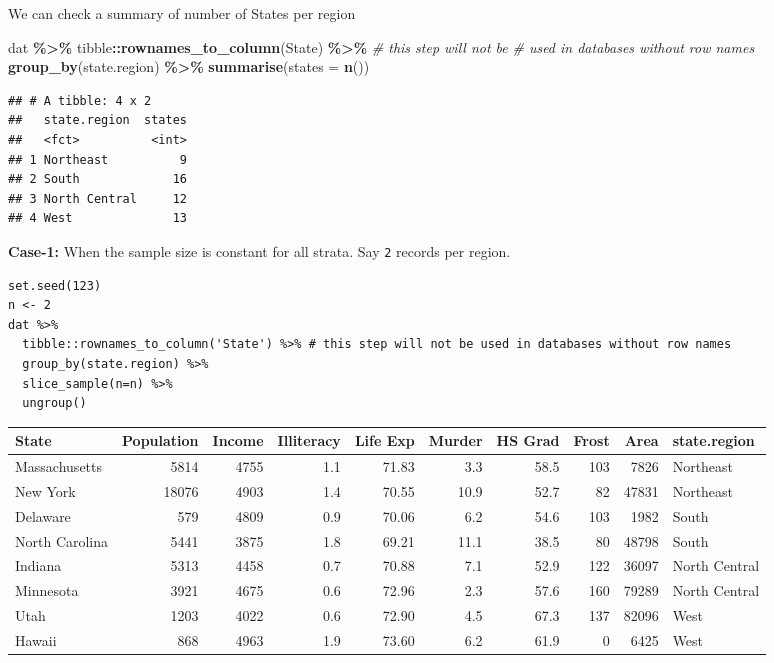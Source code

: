 \documentclass[
]{book}
\newenvironment{Shaded}{\begin{snugshade}}{\end{snugshade}}
\newcommand{\AttributeTok}[1]{\textcolor[rgb]{0.13,0.29,0.53}{#1}}
\newcommand{\CommentTok}[1]{\textcolor[rgb]{0.56,0.35,0.01}{\textit{#1}}}
\newcommand{\FunctionTok}[1]{\textcolor[rgb]{0.13,0.29,0.53}{\textbf{#1}}}
\newcommand{\NormalTok}[1]{#1}
\newcommand{\SpecialCharTok}[1]{\textcolor[rgb]{0.81,0.36,0.00}{\textbf{#1}}}
\newcommand{\StringTok}[1]{\textcolor[rgb]{0.31,0.60,0.02}{#1}}
\begin{document}
We can check a summary of number of States per region

\begin{Shaded}
\begin{Highlighting}[]
\NormalTok{dat }\SpecialCharTok{\%\textgreater{}\%} 
\NormalTok{  tibble}\SpecialCharTok{::}\FunctionTok{rownames\_to\_column}\NormalTok{(}\StringTok{\textquotesingle{}State\textquotesingle{}}\NormalTok{) }\SpecialCharTok{\%\textgreater{}\%} \CommentTok{\# this step will not be }
                                  \CommentTok{\# used in databases without row names}
  \FunctionTok{group\_by}\NormalTok{(state.region) }\SpecialCharTok{\%\textgreater{}\%} 
  \FunctionTok{summarise}\NormalTok{(}\AttributeTok{states =} \FunctionTok{n}\NormalTok{())}
\end{Highlighting}
\end{Shaded}

\begin{verbatim}
## # A tibble: 4 x 2
##   state.region  states
##   <fct>          <int>
## 1 Northeast          9
## 2 South             16
## 3 North Central     12
## 4 West              13
\end{verbatim}

\textbf{Case-1:} When the sample size is constant for all strata. Say \texttt{2} records per region.

\begin{verbatim}
set.seed(123)
n <- 2
dat %>% 
  tibble::rownames_to_column('State') %>% # this step will not be used in databases without row names
  group_by(state.region) %>% 
  slice_sample(n=n) %>% 
  ungroup()
\end{verbatim}

\begin{tabular}{l|r|r|r|r|r|r|r|r|l}
\hline
State & Population & Income & Illiteracy & Life Exp & Murder & HS Grad & Frost & Area & state.region\\
\hline
Massachusetts & 5814 & 4755 & 1.1 & 71.83 & 3.3 & 58.5 & 103 & 7826 & Northeast\\
\hline
New York & 18076 & 4903 & 1.4 & 70.55 & 10.9 & 52.7 & 82 & 47831 & Northeast\\
\hline
Delaware & 579 & 4809 & 0.9 & 70.06 & 6.2 & 54.6 & 103 & 1982 & South\\
\hline
North Carolina & 5441 & 3875 & 1.8 & 69.21 & 11.1 & 38.5 & 80 & 48798 & South\\
\hline
Indiana & 5313 & 4458 & 0.7 & 70.88 & 7.1 & 52.9 & 122 & 36097 & North Central\\
\hline
Minnesota & 3921 & 4675 & 0.6 & 72.96 & 2.3 & 57.6 & 160 & 79289 & North Central\\
\hline
Utah & 1203 & 4022 & 0.6 & 72.90 & 4.5 & 67.3 & 137 & 82096 & West\\
\hline
Hawaii & 868 & 4963 & 1.9 & 73.60 & 6.2 & 61.9 & 0 & 6425 & West\\
\hline
\end{tabular}
\end{document}

